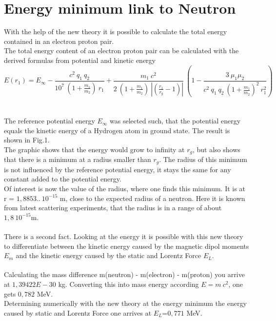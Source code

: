 \documentclass[10pt,titlepage]{article}
\begin{document}
\section{Energy minimum link to Neutron}
With the help of the new theory it is possible to calculate the total energy contained in an electron proton pair. 
\\
The total energy content of an electron proton pair can be calculated with the derived formulas from potential and kinetic energy
\begin{equation} 
E(r_1) = E_\infty -  \frac{c^2 \ q_1 \ q_2}{10^7 \ (1+\frac{m_1}{m_2}) \ r_1}+\frac{m_1 \ c^2}{2 \ (1+\frac{m_1}{m_2}) \   |(\frac{r_1}{r_g}-1)|}    \ (1-\frac{3 \ \mu_1  \mu_2}{c^2 \ q_1 \ q_2 \ (1+\frac{m_1}{m_2})^2 \ r_1^2})
\end{equation} 
\\\\
The reference potential energy $E_\infty$ was selected such, that the potential energy equals the kinetic energy of a Hydrogen atom in ground state.
The result is shown in Fig.1.
\\
The graphic shows that the energy would grow to infinity at $r_g$, but also shows that there is a minimum at a radius smaller than $r_g$. The radius of this minimum is not influenced by the reference potential energy, it stays the same for any constant added to the potential energy. \\
Of interest is now the value of the radius, where one finds this minimum. It is at r = $1,8853.. \ 10^{-15}$ m, close to the expected radius of a neutron. Here it is known from latest scattering experiments, that the radius is in a range of about $1,8  \ 10^{-15}$m.\\\\
There is a second fact. Looking at the energy it is possible with this new theory to differentiate between the kinetic energy caused by the magnetic dipol moments $E_m$ and the kinetic energy caused by the static and Lorentz Force $E_L$. 
\\\\
Calculating the mass difference m(neutron) - m(electron) - m(proton) you arrive at $1,39422E-30$ kg. Converting this into mass energy according $E=m \ c^2$, one gets $0,782$ MeV.\\
Determining numerically with the new theory at the energy minimum the energy caused by static and Lorentz Force one arrives at  $E_L$=$0,771$ MeV.\\
\end{document}

